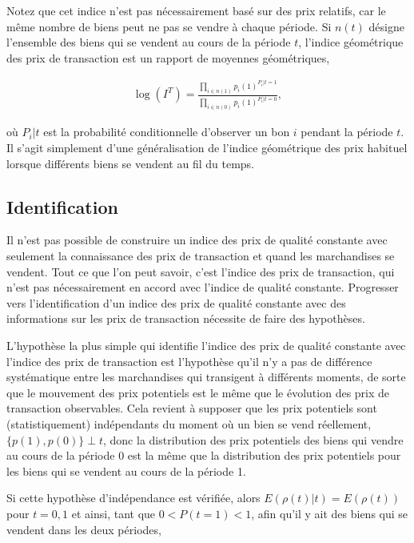 \documentclass[]{article}
\begin{document}
Notez que cet indice n'est pas nécessairement basé sur des prix relatifs, car le même nombre de biens peut ne pas se vendre à chaque période. Si \(n(t)\) désigne l'ensemble des biens qui se vendent au cours de la période \(t\), l'indice géométrique des prix de transaction est un rapport de moyennes géométriques,

\begin{align*}
\log (I^{T}) = \frac{\prod_{i \in n(1)} p_{i}(1)^{P_{i} | t = 1}}{\prod_{i \in n(0)} p_{i}(1)^{P_{i} | t = 0}},
\end{align*}

où \(P_{i} | t\) est la probabilité conditionnelle d'observer un bon \(i\) pendant la période \(t\). Il s'agit simplement d'une généralisation de l'indice géométrique des prix habituel lorsque différents biens se vendent au fil du temps.

\hypertarget{identification}{%
\subsection{Identification}\label{identification}}

Il n'est pas possible de construire un indice des prix de qualité constante avec seulement la connaissance des prix de transaction et quand les marchandises se vendent. Tout ce que l'on peut savoir, c'est l'indice des prix de transaction, qui n'est pas nécessairement en accord avec l'indice de qualité constante. Progresser vers l'identification d'un indice des prix de qualité constante avec des informations sur les prix de transaction nécessite de faire des hypothèses.

L'hypothèse la plus simple qui identifie l'indice des prix de qualité constante avec l'indice des prix de transaction est l'hypothèse qu'il n'y a pas de différence systématique entre les marchandises qui transigent à différents moments, de sorte que le mouvement des prix potentiels est le même que le évolution des prix de transaction observables. Cela revient à supposer que les prix potentiels sont (statistiquement) indépendants du moment où un bien se vend réellement, \(\{p(1), p(0)\} \perp t\), donc la distribution des prix potentiels des biens qui vendre au cours de la période 0 est la même que la distribution des prix potentiels pour les biens qui se vendent au cours de la période 1.

Si cette hypothèse d'indépendance est vérifiée, alors \(E(\rho(t) | t) = E(\rho(t))\) pour \(t = 0,1\) et ainsi, tant que \(0 <P (t = 1) <1\), afin qu'il y ait des biens qui se vendent dans les deux périodes,
\end{document}
